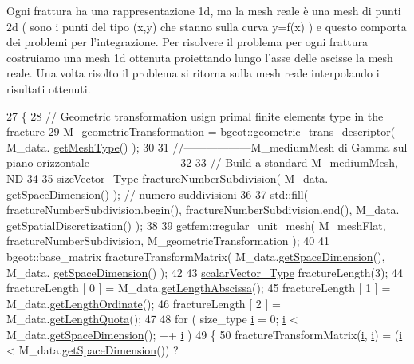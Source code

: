 Ogni frattura ha una rappresentazione 1d, ma la mesh reale è una mesh di punti 2d ( sono i punti del tipo (x,y) che stanno sulla curva y=f(x) ) e questo comporta dei problemi per l'integrazione. Per risolvere il problema per ogni frattura costruiamo una mesh 1d ottenuta proiettando lungo l'asse delle ascisse la mesh reale. Una volta risolto il problema si ritorna sulla mesh reale interpolando i risultati ottenuti. 
\begin{DoxyCode}
27 \{
28     \textcolor{comment}{// Geometric transformation usign primal finite elements type in the fracture}
29     M\_geometricTransformation = bgeot::geometric\_trans\_descriptor( M\_data.
      \hyperlink{classFractureData_aaded6c0452470489beb4ab95b5f4158f}{getMeshType}() );
30 
31     \textcolor{comment}{//------------------M\_mediumMesh di Gamma sul piano orizzontale -----------------------}
32 
33     \textcolor{comment}{// Build a standard M\_mediumMesh, ND}
34 
35     \hyperlink{Core_8h_a83c51913d041a5001e8683434c09857f}{sizeVector\_Type} fractureNumberSubdivision( M\_data.
      \hyperlink{classFractureData_a4ead03266295fe14fa3285692f945d89}{getSpaceDimension}() ); \textcolor{comment}{// numero suddivisioni}
36 
37     std::fill( fractureNumberSubdivision.begin(), fractureNumberSubdivision.end(), M\_data.
      \hyperlink{classFractureData_a5c10d579be7849be1a126c24982f8a23}{getSpatialDiscretization}() );
38 
39     getfem::regular\_unit\_mesh( M\_meshFlat, fractureNumberSubdivision, M\_geometricTransformation );
40 
41     bgeot::base\_matrix fractureTransformMatrix( M\_data.\hyperlink{classFractureData_a4ead03266295fe14fa3285692f945d89}{getSpaceDimension}(), M\_data.
      \hyperlink{classFractureData_a4ead03266295fe14fa3285692f945d89}{getSpaceDimension}() );
42 
43     \hyperlink{Core_8h_a4e75b5863535ba1dd79942de2846eff0}{scalarVector\_Type} fractureLength(3);
44     fractureLength [ 0 ] = M\_data.\hyperlink{classFractureData_abaebcf16d83713858e25837939ad3161}{getLengthAbscissa}();
45     fractureLength [ 1 ] = M\_data.\hyperlink{classFractureData_a905e953f685b1329ddcc7ee56f8302b1}{getLengthOrdinate}();
46     fractureLength [ 2 ] = M\_data.\hyperlink{classFractureData_a79747fff53da9d858950d83ad0114288}{getLengthQuota}();
47 
48     \textcolor{keywordflow}{for} ( size\_type \hyperlink{matrici_8m_a6f6ccfcf58b31cb6412107d9d5281426}{i} = 0; \hyperlink{matrici_8m_a6f6ccfcf58b31cb6412107d9d5281426}{i} < M\_data.\hyperlink{classFractureData_a4ead03266295fe14fa3285692f945d89}{getSpaceDimension}(); ++
      \hyperlink{matrici_8m_a6f6ccfcf58b31cb6412107d9d5281426}{i} )
49     \{
50         fractureTransformMatrix(\hyperlink{matrici_8m_a6f6ccfcf58b31cb6412107d9d5281426}{i}, \hyperlink{matrici_8m_a6f6ccfcf58b31cb6412107d9d5281426}{i}) = (\hyperlink{matrici_8m_a6f6ccfcf58b31cb6412107d9d5281426}{i} < M\_data.\hyperlink{classFractureData_a4ead03266295fe14fa3285692f945d89}{getSpaceDimension}()) ? 

\end{DoxyCode}
